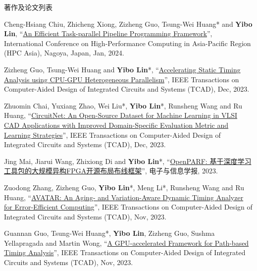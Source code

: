 \begin{rSection}{著作及论文列表}
\begin{description}[font=\normalfont, rightmargin=2em]
{}
            

\item[{[C135]}]{
        Cheng-Hsiang Chiu, Zhicheng Xiong, Zizheng Guo, Tsung-Wei Huang* and \textbf{Yibo Lin}, 
    ``\href{https://doi.org/10.1145/3635035.3635037}{An Efficient Task-parallel Pipeline Programming Framework}'', 
    International Conference on High-Performance Computing in Asia-Pacific Region (HPC Asia), Nagoya, Japan, Jan, 2024.
    
}
            

\item[{[J134]}]{
        Zizheng Guo, Tsung-Wei Huang and \textbf{Yibo Lin}*, 
    ``\href{https://doi.org/10.1109/TCAD.2023.3286261}{Accelerating Static Timing Analysis using CPU-GPU Heterogeneous Parallelism}'', 
    IEEE Transactions on Computer-Aided Design of Integrated Circuits and Systems (TCAD), Dec, 2023.
    
}
            

\item[{[J133]}]{
        Zhuomin Chai, Yuxiang Zhao, Wei Liu*, \textbf{Yibo Lin}*, Runsheng Wang and Ru Huang, 
    ``\href{https://doi.org/10.1109/TCAD.2023.3287970}{CircuitNet: An Open-Source Dataset for Machine Learning in VLSI CAD Applications with Improved Domain-Specific Evaluation Metric and Learning Strategies}'', 
    IEEE Transactions on Computer-Aided Design of Integrated Circuits and Systems (TCAD), Dec, 2023.
    
}
            

\item[{[J132]}]{
        Jing Mai, Jiarui Wang, Zhixiong Di and \textbf{Yibo Lin}*, 
    ``\href{https://jeit.ac.cn/cn/article/doi/10.11999/JEIT230387}{OpenPARF: 基于深度学习工具包的大规模异构FPGA开源布局布线框架}'', 
    电子与信息学报, 2023.
    
}
            

\item[{[J131]}]{
        Zuodong Zhang, Zizheng Guo, \textbf{Yibo Lin}*, Meng Li*, Runsheng Wang and Ru Huang, 
    ``\href{https://doi.org/10.1109/TCAD.2023.3255167}{AVATAR: An Aging- and Variation-Aware Dynamic Timing Analyzer for Error-Efficient Computing}'', 
    IEEE Transactions on Computer-Aided Design of Integrated Circuits and Systems (TCAD), Nov, 2023.
    
}
            

\item[{[J130]}]{
        Guannan Guo, Tsung-Wei Huang*, \textbf{Yibo Lin}, Zizheng Guo, Sushma Yellapragada and Martin Wong, 
    ``\href{https://doi.org/10.1109/TCAD.2023.3272274}{A GPU-accelerated Framework for Path-based Timing Analysis}'', 
    IEEE Transactions on Computer-Aided Design of Integrated Circuits and Systems (TCAD), Nov, 2023.
    
}
\end{description}
\end{rSection}

